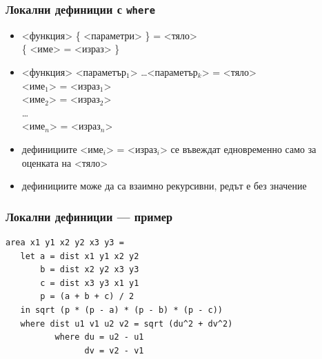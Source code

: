 \documentclass{beamer}
\begin{document}
\begin{frame}
  \frametitle{Локални дефиниции с \tt{where}}
  \begin{itemize}
  \item{} <функция> \{ <параметри> \} = <тяло>\\
        \hspace{5ex}  \{ <име> \tta= <израз> \}
  \item{} <функция> <параметър$_1$> \ldots <параметър$_k$> = <тяло>\\
        \hspace{5ex}  <име$_1$> \tta= <израз$_1$>\\
        \hspace{11ex} <име$_2$> \tta= <израз$_2$>\\
        \hspace{11ex}\ldots\\
        \hspace{11ex} <име$_n$> \tta= <израз$_n$>\\
  \item дефинициите <име$_i$> = <израз$_i$> се въвеждат едновременно само за оценката на <тяло>
  \item дефинициите може да са взаимно рекурсивни, редът е без значение
  \end{itemize}
\end{frame}

\begin{frame}[fragile]
  \frametitle{Локални дефиниции --- пример}
\begin{verbatim}
area x1 y1 x2 y2 x3 y3 =
   let a = dist x1 y1 x2 y2
       b = dist x2 y2 x3 y3
       c = dist x3 y3 x1 y1
       p = (a + b + c) / 2
   in sqrt (p * (p - a) * (p - b) * (p - c))
   where dist u1 v1 u2 v2 = sqrt (du^2 + dv^2)
          where du = u2 - u1
                dv = v2 - v1
\end{verbatim}
\end{frame}
\end{document}
